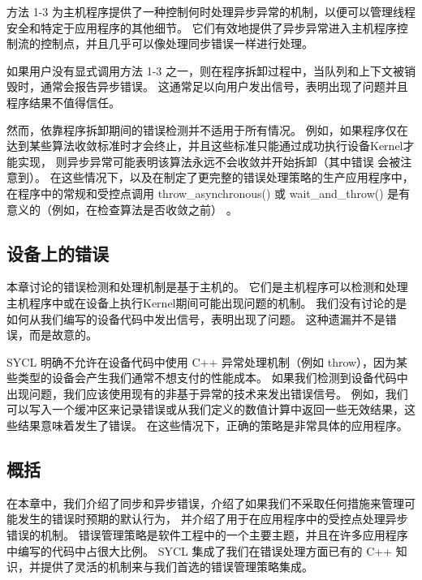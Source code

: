 方法 1-3 为主机程序提供了一种控制何时处理异步异常的机制，以便可以管理线程安全和特定于应用程序的其他细节。 
它们有效地提供了异步异常进入主机程序控制流的控制点，并且几乎可以像处理同步错误一样进行处理。

如果用户没有显式调用方法 1-3 之一，则在程序拆卸过程中，当队列和上下文被销毁时，通常会报告异步错误。 
这通常足以向用户发出信号，表明出现了问题并且程序结果不值得信任。

然而，依靠程序拆卸期间的错误检测并不适用于所有情况。 
例如，如果程序仅在达到某些算法收敛标准时才会终止，并且这些标准只能通过成功执行设备Kernel才能实现，
则异步异常可能表明该算法永远不会收敛并开始拆卸（其中错误 会被注意到）。 
在这些情况下，以及在制定了更完整的错误处理策略的生产应用程序中，
在程序中的常规和受控点调用 throw\_asynchronous() 
或 wait\_and\_throw() 是有意义的（例如，在检查算法是否收敛之前） 。

\subsection{设备上的错误}
本章讨论的错误检测和处理机制是基于主机的。 
它们是主机程序可以检测和处理主机程序中或在设备上执行Kernel期间可能出现问题的机制。 
我们没有讨论的是如何从我们编写的设备代码中发出信号，表明出现了问题。 这种遗漏并不是错误，而是故意的。

SYCL 明确不允许在设备代码中使用 C++ 异常处理机制（例如 throw），因为某些类型的设备会产生我们通常不想支付的性能成本。 
如果我们检测到设备代码中出现问题，我们应该使用现有的非基于异常的技术来发出错误信号。 
例如，我们可以写入一个缓冲区来记录错误或从我们定义的数值计算中返回一些无效结果，这些结果意味着发生了错误。 
在这些情况下，正确的策略是非常具体的应用程序。

\subsection{概括}
在本章中，我们介绍了同步和异步错误，介绍了如果我们不采取任何措施来管理可能发生的错误时预期的默认行为，
并介绍了用于在应用程序中的受控点处理异步错误的机制。 
错误管理策略是软件工程中的一个主要主题，并且在许多应用程序中编写的代码中占很大比例。 
SYCL 集成了我们在错误处理方面已有的 C++ 知识，并提供了灵活的机制来与我们首选的错误管理策略集成。